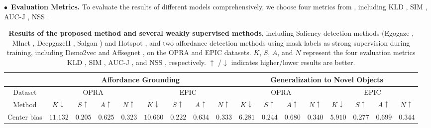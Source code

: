 \documentclass[journal,twoside]{IEEEtran}
\newcommand{\myPara}[1]{\vspace{5pt}\noindent$\bullet$~\textbf{#1} \quad}
\begin{document}
\myPara{Evaluation Metrics.}
To evaluate the results of different models comprehensively, we choose four metrics from \cite{bylinskii2018different}, including KLD \cite{bylinskii2018different}, SIM \cite{swain1991color}, AUC-J \cite{DBLP:conf/iccv/JuddEDT09}, NSS \cite{peters2005components}.

\begin{table*}[!t]
  \begin{center}
  \small
  \renewcommand{\arraystretch}{1.}
  \renewcommand{\tabcolsep}{2.8pt}
   \caption{\textbf{Results of the proposed method and several weakly supervised methods}, including Saliency detection methods (Egogaze \cite{DBLP:conf/eccv/HuangCLS18}, Mlnet \cite{DBLP:conf/icpr/CorniaBSC16}, DeepgazeII \cite{DBLP:journals/corr/KummererWB16}, Salgan \cite{Pan_2017_SalGAN}) and Hotspot \cite{interaction-hotspots}, and two affordance detection methods using mask labels as strong supervision during training, including Demo2vec \cite{demo2vec2018cvpr} and Affsegnet \cite{interaction-hotspots}, on the OPRA \cite{demo2vec2018cvpr} and EPIC \cite{Damen2018EPICKITCHENS} datasets. $K$, $S$, $A$, and $N$ represent the four evaluation metrics KLD \cite{bylinskii2018different}, SIM \cite{swain1991color}, AUC-J \cite{DBLP:conf/iccv/JuddEDT09}, and NSS \cite{peters2005components}, respectively. $\uparrow$ /$\downarrow$ indicates higher/lower results are better. 
   }
   \label{Table:1}
  \begin{tabular}{r|cccc|cccc|cccc|cccc}
    \hline\toprule
    \multicolumn{1}{c|}{\quad} & \multicolumn{8}{c|}{\textbf{Affordance Grounding}} & \multicolumn{8}{c}{\textbf{Generalization to Novel Objects}} \\ 
    \hline
    \multicolumn{1}{c|}{Dataset} & \multicolumn{4}{c|}{OPRA \cite{demo2vec2018cvpr}} & \multicolumn{4}{c|}{EPIC \cite{Damen2018EPICKITCHENS}} & \multicolumn{4}{c|}{OPRA \cite{demo2vec2018cvpr}} & \multicolumn{4}{c}{EPIC \cite{Damen2018EPICKITCHENS}}\\ 
    \hline
    \multicolumn{1}{c|}{Method} & \emph{$K\downarrow$} & \emph{$S\uparrow$} & \emph{$A\uparrow$} & \emph{$N\uparrow$} & \emph{$K\downarrow$} & \emph{$S\uparrow$} & \emph{$A\uparrow$} &  \emph{$N\uparrow$} & \emph{$K\downarrow$} & \emph{$S\uparrow$} & \emph{$A\uparrow$} & \emph{$N\uparrow$} & \emph{$K\downarrow$} & \emph{$S\uparrow$} & \emph{$A\uparrow$} & \emph{$N\uparrow$} \\ 
    \hline
    Center bias & $11.132$ & $0.205$ & $0.625$ & $0.323$ & $10.660$ & $0.222$ & $0.634$	& $0.333$ & $6.281$ &	$0.244$ & $0.680$ & $0.340$ & 	$5.910$ & $0.277$ & $0.699$ & $0.344$  \\

\end{tabular}
\end{center}
\end{table*}
\end{document}
